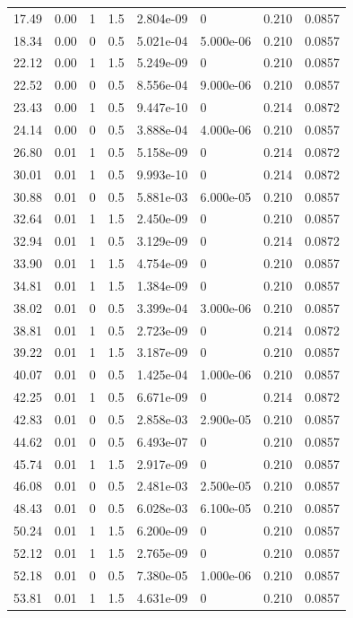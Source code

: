 \documentclass[preview]{standalone}
\begin{document}
{{\begin{tabular}{L{1.2cm}C{1.2cm} C{0.3cm}C{0.5cm} C{1.4cm}C{1.4cm} C{1.4cm}C{1.4cm}}
  17.49  &  0.00  & 1     & 1.5 &  2.804e-09  & 0  & 0.210 &  0.0857   \\ 
  18.34  &  0.00  & 0     & 0.5 &  5.021e-04  & 5.000e-06  & 0.210 &  0.0857   \\ 
  22.12  &  0.00  & 1     & 1.5 &  5.249e-09  & 0  & 0.210 &  0.0857   \\ 
  22.52  &  0.00  & 0     & 0.5 &  8.556e-04  & 9.000e-06  & 0.210 &  0.0857   \\ 
  23.43  &  0.00  & 1     & 0.5 &  9.447e-10  & 0  & 0.214 &  0.0872   \\ 
  24.14  &  0.00  & 0     & 0.5 &  3.888e-04  & 4.000e-06  & 0.210 &  0.0857   \\ 
  26.80  &  0.01  & 1     & 0.5 &  5.158e-09  & 0  & 0.214 &  0.0872   \\ 
  30.01  &  0.01  & 1     & 0.5 &  9.993e-10  & 0  & 0.214 &  0.0872   \\ 
  30.88  &  0.01  & 0     & 0.5 &  5.881e-03  & 6.000e-05  & 0.210 &  0.0857   \\ 
  32.64  &  0.01  & 1     & 1.5 &  2.450e-09  & 0  & 0.210 &  0.0857   \\ 
  32.94  &  0.01  & 1     & 0.5 &  3.129e-09  & 0  & 0.214 &  0.0872   \\ 
  33.90  &  0.01  & 1     & 1.5 &  4.754e-09  & 0  & 0.210 &  0.0857   \\ 
  34.81  &  0.01  & 1     & 1.5 &  1.384e-09  & 0  & 0.210 &  0.0857   \\ 
  38.02  &  0.01  & 0     & 0.5 &  3.399e-04  & 3.000e-06  & 0.210 &  0.0857   \\ 
  38.81  &  0.01  & 1     & 0.5 &  2.723e-09  & 0  & 0.214 &  0.0872   \\ 
  39.22  &  0.01  & 1     & 1.5 &  3.187e-09  & 0  & 0.210 &  0.0857   \\ 
  40.07  &  0.01  & 0     & 0.5 &  1.425e-04  & 1.000e-06  & 0.210 &  0.0857   \\ 
  42.25  &  0.01  & 1     & 0.5 &  6.671e-09  & 0  & 0.214 &  0.0872   \\ 
  42.83  &  0.01  & 0     & 0.5 &  2.858e-03  & 2.900e-05  & 0.210 &  0.0857   \\ 
  44.62  &  0.01  & 0     & 0.5 &  6.493e-07  & 0  & 0.210 &  0.0857   \\ 
  45.74  &  0.01  & 1     & 1.5 &  2.917e-09  & 0  & 0.210 &  0.0857   \\ 
  46.08  &  0.01  & 0     & 0.5 &  2.481e-03  & 2.500e-05  & 0.210 &  0.0857   \\ 
  48.43  &  0.01  & 0     & 0.5 &  6.028e-03  & 6.100e-05  & 0.210 &  0.0857   \\ 
  50.24  &  0.01  & 1     & 1.5 &  6.200e-09  & 0  & 0.210 &  0.0857   \\ 
  52.12  &  0.01  & 1     & 1.5 &  2.765e-09  & 0  & 0.210 &  0.0857   \\ 
  52.18  &  0.01  & 0     & 0.5 &  7.380e-05  & 1.000e-06  & 0.210 &  0.0857   \\ 
  53.81  &  0.01  & 1     & 1.5 &  4.631e-09  & 0  & 0.210 &  0.0857   \\ 
\hline 
\end{tabular} 

}}
\end{document}
